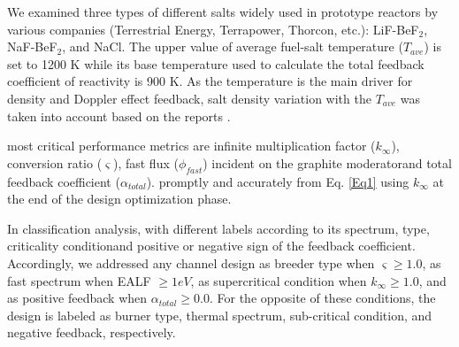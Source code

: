     We examined three types of different salts widely used in prototype reactors by various companies (Terrestrial Energy, Terrapower, Thorcon, etc.): LiF-BeF$_2$, NaF-BeF$_2$, and NaCl. The upper value of \DIFaddbegin {}\DIFaddend average fuel-salt temperature ($T_{ave}$) is set to 1200 K while its base temperature used to calculate the total feedback coefficient of reactivity is 900 K. As the temperature is the main driver for \DIFdelbegin {}\DIFdelend \DIFaddbegin {}\DIFaddend density and Doppler effect \DIFdelbegin {}\DIFdelend \DIFaddbegin {}\DIFaddend feedback, salt density variation with the $T_{ave}$ was taken into account based on the reports \cite{Janz1988, Jerden2019}.

    \DIFdelbegin {}\DIFdelend \DIFaddbegin {}\DIFaddend most critical performance metrics are \DIFdelbegin {}\DIFdelend \DIFaddbegin {}\DIFaddend infinite multiplication factor ($k_{\infty}$), conversion ratio ($\varsigma$), fast flux ($\phi_{fast}$) incident on the graphite moderator\DIFaddbegin \DIFadd{, }\DIFaddend and total feedback coefficient (${\alpha_{total}}$). \DIFdelbegin {}\DIFdelend \DIFaddbegin {}\DIFaddend promptly and accurately \DIFaddbegin {}\DIFaddend from Eq. \protect\ref{Eq1} using $k_{\infty}$ \DIFdelbegin {}\DIFdelend at the end of the design optimization phase.

    In \DIFaddbegin {}\DIFaddend classification analysis, \DIFdelbegin {}\DIFdelend \DIFaddbegin {}\DIFaddend with different labels according to its spectrum, type, criticality condition\DIFaddbegin \DIFadd{, }\DIFaddend and positive or \DIFaddbegin {}\DIFaddend negative sign of the feedback coefficient. Accordingly, we addressed any channel design as breeder type when $\varsigma \geq 1.0$, as fast spectrum when \gls{EALF} $\geq 1eV$, as supercritical condition when $k_{\infty} \geq 1.0$, and as positive feedback when ${\alpha_{total}} \geq 0.0$. For the opposite of these conditions, the design is labeled as burner type, thermal spectrum, sub-critical condition, and negative feedback, respectively.

